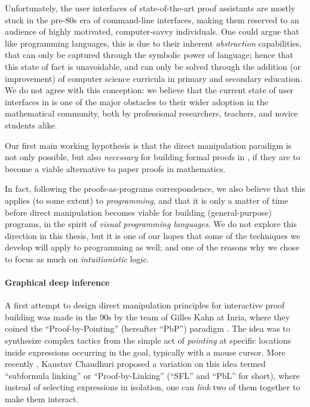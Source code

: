 Unfortunately, the user interfaces of state-of-the-art proof assistants are
mostly stuck in the pre-80s era of command-line interfaces, making them reserved
to an audience of highly motivated, computer-savvy individuals. One could argue
that like programming languages, this is due to their inherent
\emph{abstraction} capabilities, that can only be captured through the symbolic
power of language; hence that this state of fact is unavoidable, and can only be
solved through the addition (or improvement) of computer science curricula in
primary and secondary education. We do not agree with this conception: we
believe that the current state of user interfaces in  is one of the major
obstacles to their wider adoption in the mathematical community, both by
professional researchers, teachers, and novice students alike.

\begin{emphpar}
  Our first main working hypothesis is that the direct manipulation paradigm is
  not only possible, but also \emph{necessary} for building formal proofs in
  , if they are to become a viable alternative to paper proofs in
  mathematics.
\end{emphpar}

In fact, following the proofs-as-programs correspondence, we also believe that
this applies (to some extent) to \emph{programming}, and that it is only a
matter of time before direct manipulation becomes viable for building
(general-purpose) programs, in the spirit of \emph{visual programming
languages}. We do not explore this direction in this thesis, but it is one of
our hopes that some of the techniques we develop will apply to programming as
well; and one of the reasons why we chose to focus as much on
\emph{intuitionistic} logic.

\paragraph{Graphical deep inference}

A first attempt to design direct manipulation principles for interactive proof
building was made in the 90s by the team of Gilles Kahn at Inria, where they
coined the ``Proof-by-Pointing'' (hereafter ``PbP'') paradigm .
The idea was to synthesize complex tactics from the simple act of
\emph{pointing} at specific locations inside expressions occurring in the goal,
typically with a mouse cursor. More recently , Kaustuv
Chaudhuri proposed a variation on this idea termed ``subformula linking'' or
``Proof-by-Linking'' (``SFL'' and ``PbL'' for short), where instead of selecting
expressions in isolation, one can \emph{link} two of them together to make them
interact.

